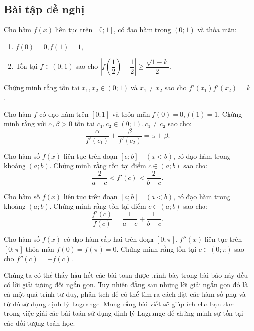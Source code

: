 \subsection{Bài tập đề nghị}
\begin{bt}%
	Cho hàm $ f(x) $ liên tục trên $ [0;1] $, có đạo hàm trong $ (0;1) $ và thỏa mãn:
	\begin{enumerate}
		\item $ f(0)=0, f(1)=1 $,
		\item Tồn tại $ f\in (0;1) $ sao cho $ \left| f\left(\dfrac{1}{2}\right)-\dfrac{1}{2}\right|\ge \dfrac{\sqrt{1-k}}{2} $.
	\end{enumerate}
	Chứng minh rằng tồn tại $ x_1, x_2 \in (0;1) $ và $ x_1\ne x_2 $ sao cho $ f'(x_1)f'(x_2)=k $.
\end{bt}
\begin{bt}%
	Cho hàm $ f $ có đạo hàm trên $ [0;1] $ và thỏa mãn $ f(0)=0, f(1)=1 $. Chứng minh rằng với $ \alpha, \beta>0 $ tồn tại $ c_1, c_2 \in (0;1), c_1\ne c_2 $ sao cho:
	$$\dfrac{\alpha}{f'(c_1)}+\dfrac{\beta}{f'(c_2)}=\alpha+\beta.$$
\end{bt}
\begin{bt}%
	Cho hàm số $ f(x) $ liên tục trên đoạn $ [a;b] \quad (a<b) $, có đạo hàm trong khoảng $ (a;b) $. Chứng minh rằng tồn tại điểm $ c\in(a;b) $ sao cho:
	$$\dfrac{2}{a-c}<f'(c)<\dfrac{2}{b-c}.$$
\end{bt}
\begin{bt}%
	Cho hàm số $ f(x) $ liên tục trên đoạn $ [a;b] \quad (a<b) $, có đạo hàm trong khoảng $ (a;b) $. Chứng minh rằng tồn tại điểm $ c\in(a;b) $ sao cho:
	$$\dfrac{f'(c)}{f(c)}=\dfrac{1}{a-c}+\dfrac{1}{b-c}.$$
\end{bt}
\begin{bt}%
	Cho hàm số $ f(x) $ có đạo hàm cấp hai trên đoạn $ [0;\pi] $, $ f''(x) $ liên tục trên $ [0; \pi] $ thỏa mãn $ f(0)=f(\pi)=0 $. Chứng minh rằng tồn tại $ c\in (0;\pi) $ sao cho $ f''(c)=-f(c) $.
\end{bt}
 Chúng ta có thể thấy hầu hết các bài toán được trình bày trong bài báo này đều có lời giải tương đối ngắn gọn. Tuy nhiên đằng sau những lời giải ngắn gọn đó là cả một quá trình tư duy, phân tích để có thể tìm ra cách đặt các hàm số phụ và từ đó sử dụng định lý Lagrange. Mong rằng bài viết sẽ giúp ích cho bạn đọc trong việc giải các bài toán sử dụng định lý Lagrange để chứng minh sự tồn tại các đối tượng toán học.



